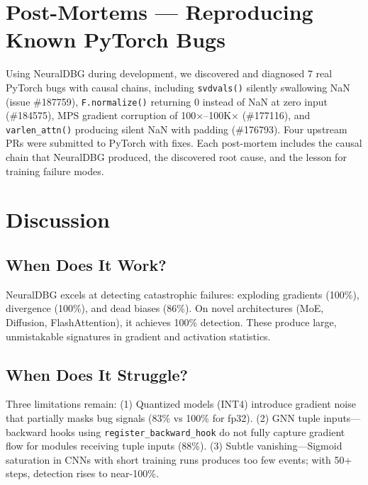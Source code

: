 \documentclass[11pt]{article}
\begin{document}
\section{Post-Mortems — Reproducing Known PyTorch Bugs}

Using NeuralDBG during development, we discovered and diagnosed 7 real PyTorch bugs with causal chains, including \texttt{svdvals()} silently swallowing NaN (issue \#187759), \texttt{F.normalize()} returning 0 instead of NaN at zero input (\#184575), MPS gradient corruption of 100$\times$--100K$\times$ (\#177116), and \texttt{varlen\_attn()} producing silent NaN with padding (\#176793). Four upstream PRs were submitted to PyTorch with fixes. Each post-mortem includes the causal chain that NeuralDBG produced, the discovered root cause, and the lesson for training failure modes.

\section{Discussion}

\subsection{When Does It Work?}

NeuralDBG excels at detecting catastrophic failures: exploding gradients (100\%), divergence (100\%), and dead biases (86\%). On novel architectures (MoE, Diffusion, FlashAttention), it achieves 100\% detection. These produce large, unmistakable signatures in gradient and activation statistics.

\subsection{When Does It Struggle?}

Three limitations remain: (1) Quantized models (INT4) introduce gradient noise that partially masks bug signals (83\% vs 100\% for fp32). (2) GNN tuple inputs—backward hooks using \texttt{register\_backward\_hook} do not fully capture gradient flow for modules receiving tuple inputs (88\%). (3) Subtle vanishing—Sigmoid saturation in CNNs with short training runs produces too few events; with 50+ steps, detection rises to near-100\%.
\end{document}
